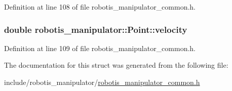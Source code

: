 Definition at line 108 of file robotis\+\_\+manipulator\+\_\+common.\+h.

\subsubsection[{\texorpdfstring{velocity}{velocity}}]{\setlength{\rightskip}{0pt plus 5cm}double robotis\+\_\+manipulator\+::\+Point\+::velocity}\hypertarget{structrobotis__manipulator_1_1_point_a4eaec95fac0c755eb0aa704b36ebe97b}{}\label{structrobotis__manipulator_1_1_point_a4eaec95fac0c755eb0aa704b36ebe97b}


Definition at line 109 of file robotis\+\_\+manipulator\+\_\+common.\+h.



The documentation for this struct was generated from the following file\+:\begin{DoxyCompactItemize}
\item 
include/robotis\+\_\+manipulator/\hyperlink{robotis__manipulator__common_8h}{robotis\+\_\+manipulator\+\_\+common.\+h}\end{DoxyCompactItemize}

